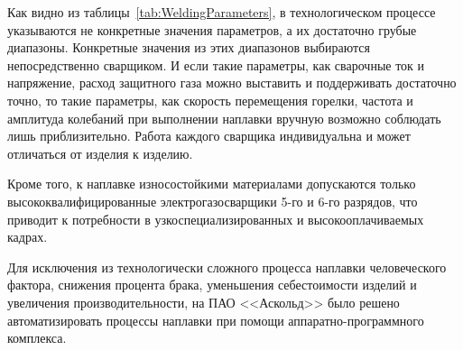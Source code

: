 Как видно из таблицы~\ref{tab:WeldingParameters}, в технологическом процессе указываются не конкретные значения параметров, а их достаточно грубые диапазоны.
Конкретные значения из этих диапазонов выбираются непосредственно сварщиком.
И если такие параметры, как сварочные ток и напряжение, расход защитного газа можно выставить и поддерживать достаточно точно, то такие параметры, как скорость перемещения горелки, частота и амплитуда колебаний при выполнении наплавки вручную возможно соблюдать лишь приблизительно.
Работа каждого сварщика индивидуальна и может отличаться от изделия к изделию.

Кроме того, к наплавке износостойкими материалами допускаются только высококвалифицированные электрогазосварщики 5-го и 6-го разрядов, что приводит к потребности в узкоспециализированных и высокооплачиваемых кадрах.

Для исключения из технологически сложного процесса наплавки человеческого фактора, снижения процента брака, уменьшения себестоимости изделий и увеличения производительности, на ПАО <<Аскольд>> было решено автоматизировать процессы наплавки при помощи аппаратно-программного комплекса.
